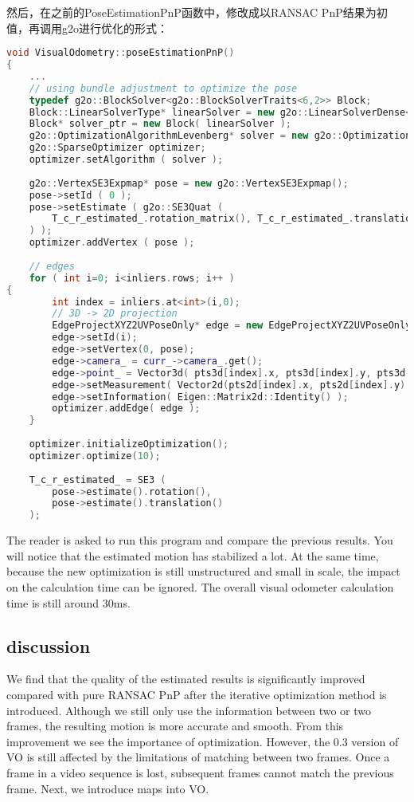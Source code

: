 然后，在之前的PoseEstimationPnP函数中，修改成以RANSAC PnP结果为初值，再调用g2o进行优化的形式：
\begin{lstlisting}[language=c++,caption=slambook/project/0.3/src/visual\_odometry.cpp]
void VisualOdometry::poseEstimationPnP()
{
	... 
	// using bundle adjustment to optimize the pose 
	typedef g2o::BlockSolver<g2o::BlockSolverTraits<6,2>> Block;
	Block::LinearSolverType* linearSolver = new g2o::LinearSolverDense<Block::PoseMatrixType>();
	Block* solver_ptr = new Block( linearSolver );
	g2o::OptimizationAlgorithmLevenberg* solver = new g2o::OptimizationAlgorithmLevenberg ( solver_ptr );
	g2o::SparseOptimizer optimizer;
	optimizer.setAlgorithm ( solver );
	
	g2o::VertexSE3Expmap* pose = new g2o::VertexSE3Expmap();
	pose->setId ( 0 );
	pose->setEstimate ( g2o::SE3Quat (
		T_c_r_estimated_.rotation_matrix(), T_c_r_estimated_.translation()
	) );
	optimizer.addVertex ( pose );
	
	// edges
	for ( int i=0; i<inliers.rows; i++ )
{
		int index = inliers.at<int>(i,0);
		// 3D -> 2D projection
		EdgeProjectXYZ2UVPoseOnly* edge = new EdgeProjectXYZ2UVPoseOnly();
		edge->setId(i);
		edge->setVertex(0, pose);
		edge->camera_ = curr_->camera_.get();
		edge->point_ = Vector3d( pts3d[index].x, pts3d[index].y, pts3d[index].z );
		edge->setMeasurement( Vector2d(pts2d[index].x, pts2d[index].y) );
		edge->setInformation( Eigen::Matrix2d::Identity() );
		optimizer.addEdge( edge );
	}
	
	optimizer.initializeOptimization();
	optimizer.optimize(10);
	
	T_c_r_estimated_ = SE3 (
		pose->estimate().rotation(),
		pose->estimate().translation()
	);
\end{lstlisting}

The reader is asked to run this program and compare the previous results. You will notice that the estimated motion has stabilized a lot. At the same time, because the new optimization is still unstructured and small in scale, the impact on the calculation time can be ignored. The overall visual odometer calculation time is still around 30ms.

\subsection *{discussion}
We find that the quality of the estimated results is significantly improved compared with pure RANSAC PnP after the iterative optimization method is introduced. Although we still only use the information between two or two frames, the resulting motion is more accurate and smooth. From this improvement we see the importance of optimization. However, the 0.3 version of VO is still affected by the limitations of matching between two frames. Once a frame in a video sequence is lost, subsequent frames cannot match the previous frame. Next, we introduce maps into VO.

